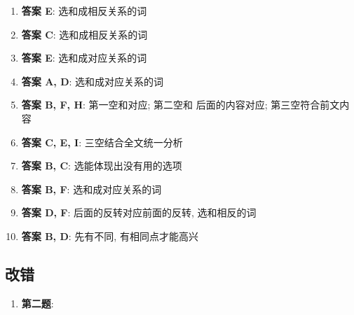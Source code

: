   \begin{enumerate}
    \item \textbf{答案 E}: 选和成相反关系的词
    \item \textbf{答案 C}: 选和成相反关系的词
    \item \textbf{答案 E}: 选和成对应关系的词
    \item \textbf{答案 A, D}: 选和成对应关系的词
    \item \textbf{答案 B, F, H}: 第一空和对应; 第二空和
    后面的内容对应; 第三空符合前文内容
    \item \textbf{答案 C, E, I}: 三空结合全文统一分析
    \item \textbf{答案 B, C}: 选能体现出没有用的选项
    \item \textbf{答案 B, F}: 选和成对应关系的词
    \item \textbf{答案 D, F}: 后面的反转对应前面的反转, 选和相反的词
    \item \textbf{答案 B, D}: 先有不同, 有相同点才能高兴
  \end{enumerate}

  \subsection{改错}

    \begin{enumerate}
      \item \textbf{第二题}:
    \end{enumerate}
